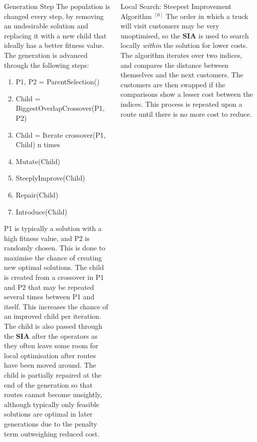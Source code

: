 \documentclass[ %
                    author={Callum Mann},
                     title={Genetic algorithm for the CVRP},
                  subtitle={Capacitated Vehicle Routing Problem},
                      type={Heuristic},
                      year={2016}]{poster}
\begin{document}
\begin{frame}{}
\begin{columns}[t]
\begin{column}{0.422\linewidth}
    \vfill

    \begin{block}{\Large Generation Step}
      The population is changed every step, by removing an undesirable solution and
      replacing it with a new child that ideally has a better fitness value. The generation
      is advanced through the following steps:
      \begin{enumerate}
        \item P1, P2 = ParentSelection()
        \item Child = BiggestOverlapCrossover(P1, P2)
        \item Child = Iterate crossover(P1, Child) n times
        \item Mutate(Child)
        \item SteeplyImprove(Child)
        \item Repair(Child)
        \item Introduce(Child)
      \end{enumerate}
      \vspace{1cm}

      P1 is typically a solution with a high fitness value, and P2 is randomly chosen.
      This is done to maximise the chance of creating new optimal solutions. The child
      is created from a crossover in P1 and P2 that may be repeated several times between
      P1 and itself. This increases the chance of an improved child per iteration.
      \vspace{1cm} \\
      The child is also passed through the \textbf{SIA} after the operators as
      they often leave some room for local optimisation after routes have been
      moved around. The child is partially repaired at the end of the generation
      so that routes cannot become unsightly,
      although typically only feasible solutions are optimal in later generations
      due to the penalty term outweighing reduced cost.

    \end{block}
    \vspace{1cm}

  \end{column}

  \begin{column}{0.450\linewidth}
    \begin{block}{\Large Local Search: Steepest Improvement Algorithm $^{[0]}$}
      The order in which a truck will visit customers may be very unoptimised, so the \textbf{SIA} is used
      to search locally \textit{within} the solution for lower costs. The algorithm iterates over two indices,
      and compares the distance between themselves and the next customers. The customers are then swapped
      if the comparisons show a lesser cost between the indices. This process is repeated upon a route until there
      is no more cost to reduce.
    \end{block}
    \vspace{1cm}


\end{column}
\end{columns}
\end{frame}
\end{document}
